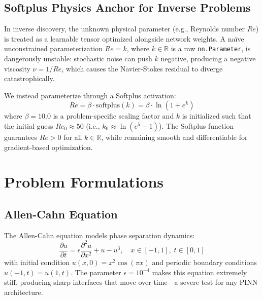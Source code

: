 \documentclass[conference]{IEEEtran}
\begin{document}
\subsection{Softplus Physics Anchor for Inverse Problems}
\label{sec:anchor}

In inverse discovery, the unknown physical parameter (e.g., Reynolds number $Re$) is treated as a learnable tensor optimized alongside network weights. A na\"ive unconstrained parameterization $Re = k$, where $k \in \mathbb{R}$ is a raw \texttt{nn.Parameter}, is dangerously unstable: stochastic noise can push $k$ negative, producing a negative viscosity $\nu = 1/Re$, which causes the Navier-Stokes residual to diverge catastrophically.

We instead parameterize through a Softplus activation:
\begin{equation}
    Re = \beta \cdot \text{softplus}(k) = \beta \cdot \ln(1 + e^k)
    \label{eq:softplus}
\end{equation}
where $\beta = 10.0$ is a problem-specific scaling factor and $k$ is initialized such that the initial guess $Re_0 \approx 50$ (i.e., $k_0 \approx \ln(e^{5} - 1)$). The Softplus function guarantees $Re > 0$ for all $k \in \mathbb{R}$, while remaining smooth and differentiable for gradient-based optimization.

\section{Problem Formulations}
\label{sec:problems}

\subsection{Allen-Cahn Equation}
The Allen-Cahn equation models phase separation dynamics:
\begin{equation}
    \frac{\partial u}{\partial t} = \epsilon \frac{\partial^2 u}{\partial x^2} + u - u^3, \quad x \in [-1, 1],\; t \in [0, 1]
    \label{eq:ac}
\end{equation}
with initial condition $u(x, 0) = x^2 \cos(\pi x)$ and periodic boundary conditions $u(-1, t) = u(1, t)$. The parameter $\epsilon = 10^{-4}$ makes this equation extremely stiff, producing sharp interfaces that move over time---a severe test for any PINN architecture.
\end{document}
